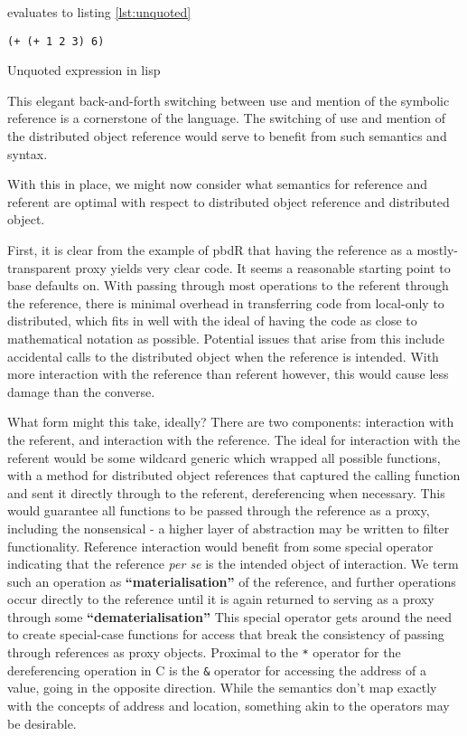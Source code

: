evaluates to listing \cref{lst:unquoted}

\begin{listing}
    \begin{verbatim}
(+ (+ 1 2 3) 6)
    \end{verbatim}
    \caption{Unquoted expression in lisp}
    \label{lst:unquoted}
\end{listing}


This elegant back-and-forth switching between use and mention of the
symbolic reference is a cornerstone of the language. The switching of
use and mention of the distributed object reference would serve to
benefit from such semantics and syntax.

With this in place, we might now consider what semantics for reference
and referent are optimal with respect to distributed object reference
and distributed object.

First, it is clear from the example of pbdR that having the reference as
a mostly-transparent proxy yields very clear code. It seems a reasonable
starting point to base defaults on. With passing through most operations
to the referent through the reference, there is minimal overhead in
transferring code from local-only to distributed, which fits in well
with the ideal of having the code as close to mathematical notation as
possible. Potential issues that arise from this include accidental calls
to the distributed object when the reference is intended. With more
interaction with the reference than referent however, this would cause
less damage than the converse.

What form might this take, ideally? There are two components:
interaction with the referent, and interaction with the reference. The
ideal for interaction with the referent would be some wildcard generic
which wrapped all possible functions, with a method for distributed
object references that captured the calling function and sent it
directly through to the referent, dereferencing when necessary. This
would guarantee all functions to be passed through the reference as a
proxy, including the nonsensical - a higher layer of abstraction may be
written to filter functionality. Reference interaction would benefit
from some special operator indicating that the reference \emph{per se}
is the intended object of interaction. We term such an operation as
\textbf{``materialisation''} of the reference, and further operations
occur directly to the reference until it is again returned to serving as
a proxy through some \textbf{``dematerialisation''} This special
operator gets around the need to create special-case functions for
access that break the consistency of passing through references as proxy
objects. Proximal to the \texttt{*} operator for the dereferencing
operation in C is the \texttt{\&} operator for accessing the address of
a value, going in the opposite direction. While the semantics don't map
exactly with the concepts of address and location, something akin to the
operators may be desirable.

